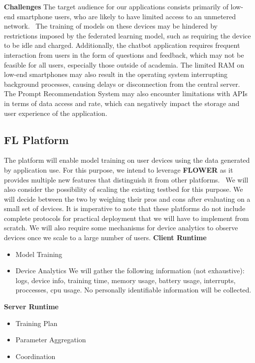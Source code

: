         \textbf{Challenges}
        The target audience for our applications consists primarily of low-end smartphone 
        users, who are likely to have limited access to an unmetered network.~\cite{10.1504/IJMC.2005.006583} The training 
        of models on these devices may be hindered by restrictions imposed by the federated 
        learning model, such as requiring the device to be idle and charged. Additionally, the 
        chatbot application requires frequent interaction from users in the form of questions and 
        feedback, which may not be feasible for all users, especially those outside of academia. 
        The limited RAM on low-end smartphones may also result in the operating system 
        interrupting background processes, causing delays or disconnection from the central 
        server. The Prompt Recommendation System may also encounter limitations with APIs 
        in terms of data access and rate, which can negatively impact the storage and user 
        experience of the application.
    
        \subsection{FL Platform}
        The platform will enable model training on user devices using the data generated by application use. For this purpose, we intend to leverage \textbf{FLOWER} as it provides multiple new features that distinguish it from other platforms.~\cite{DBLP:journals/corr/abs-2007-14390} We will also consider the possibility of scaling the existing testbed for this purpose. We will decide between the two by weighing their pros and cons after evaluating on a small set of devices. It is imperative to note that these platforms do not include complete protocols for practical deployment that we will have to implement from scratch. We will also require some mechanisms for device analytics to observe devices once we scale to a large number of users.\newline \newline
        \textbf{Client Runtime}
            \begin{itemize}
                \item Model Training
                \item Device Analytics \newline
                    We will gather the following information (not exhaustive): logs, device info, training time, memory usage, battery usage, interrupts, proccesses, cpu usage. No personally identifiable information will be collected. \newline  
            \end{itemize}
        \textbf{Server Runtime}
            \begin{itemize}
                \item Training Plan
                \item Parameter Aggregation
                \item Coordination
            \end{itemize}
